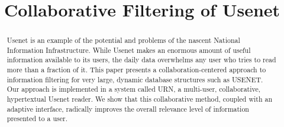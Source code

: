 
%





\title {Collaborative Filtering of Usenet}




\maketitle


\begin{abstract}
  
  Usenet is an example of the potential and problems of the nascent National
  Information Infrastructure. While Usenet makes an enormous amount of useful
  information available to its users, the daily data overwhelms any user who
  tries to read more than a fraction of it. This paper presents a
  collaboration-centered approach to information filtering for very large,
  dynamic database structures such as USENET. Our approach is implemented in
  a system called URN, a multi-user, collaborative, hypertextual Usenet
  reader.  We show that this collaborative method, coupled with an adaptive
  interface, radically improves the overall relevance level of information
  presented to a user.

\end{abstract}


